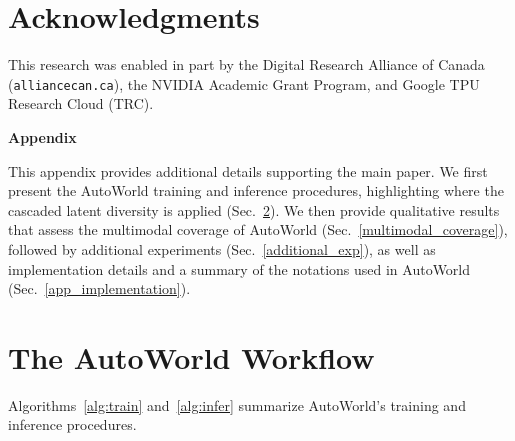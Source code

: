 \documentclass[runningheads]{llncs}
\begin{document}
\vspace{-1.1mm}

\section{Acknowledgments}
This research was enabled in part by the Digital Research Alliance of Canada (\texttt{alliancecan.ca}), the NVIDIA Academic Grant Program, and Google TPU Research Cloud (TRC).


 



\clearpage
\appendix
\setcounter{section}{0}

\renewcommand{\thesection}{\Alph{section}}
\renewcommand{\theHsection}{appendix.\Alph{section}}

{\noindent\LARGE\bfseries Appendix\par}
\vspace{1em}


This appendix provides additional details supporting the main paper. We first present the AutoWorld training and inference procedures, highlighting where the cascaded latent diversity is applied (Sec.~\ref{Workflow}). We then provide qualitative results that assess the multimodal coverage of AutoWorld (Sec.~\ref{multimodal_coverage}), followed by additional experiments (Sec.~\ref{additional_exp}), as well as implementation details and a summary of the notations used in AutoWorld (Sec.~\ref{app_implementation}).


\section{The AutoWorld Workflow} \label{Workflow}
Algorithms~\ref{alg:train} and~\ref{alg:infer} summarize AutoWorld's training and inference procedures.
\end{document}
